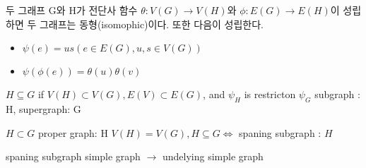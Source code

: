 \documentclass{oblivoir}
\begin{document}
\begin{thm}[isomophic] 두 그래프 G와 H가  전단사 함수 $\theta : V(G) \longrightarrow V(H)$와 $\phi : E(G) \rightarrow E(H)$이 성립하면 두 그래프는 동형(isomophic)이다.
    또한 다음이 성립한다.
\begin{itemize}
    \item $\psi(e) = us( e \in E(G), u,s \in V(G)) $
    \item $\psi(\phi(e)) = \theta(u)\theta(v)$%
\end{itemize}
\end{thm}

  $H \subseteq G$ if $ V(H) \subset V(G), E(V) \subset E(G)$, and $\psi_{H}$ is restricton $\psi_{G}$
    subgraph : H, supergraph: G

    $ H \subset G$ proper graph: H
    $V(H) = V(G) , H \subseteq G \Longleftrightarrow$ spaning subgraph : $H$

    spaning subgraph  simple graph $\rightarrow$ undelying simple graph
\end{document}
